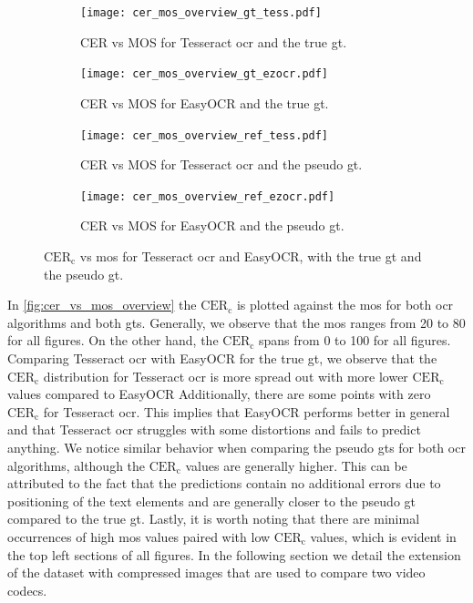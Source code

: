 \begin{figure}
    \begin{subfigure}[b]{0.45\textwidth}
        \centering
        \texttt{[image: cer\_mos\_overview\_gt\_tess.pdf]}
        \caption{CER vs MOS for Tesseract \gls{ocr} and the true \gls{gt}.}
        \label{fig:cer_vs_mos_gt_tess}
    \end{subfigure}
    \hfill
    \begin{subfigure}[b]{0.45\textwidth}
        \centering
        \texttt{[image: cer\_mos\_overview\_gt\_ezocr.pdf]}
        \caption{CER vs MOS for EasyOCR and the true \gls{gt}.}
        \label{fig:cer_vs_mos_gt_ocr}
    \end{subfigure}
    \newline
    \begin{subfigure}[b]{0.45\textwidth}
        \centering
        \texttt{[image: cer\_mos\_overview\_ref\_tess.pdf]}
        \caption{CER vs MOS for Tesseract \gls{ocr} and the pseudo \gls{gt}.}
        \label{fig:cer_vs_mos_ref_tess}
    \end{subfigure}
    \hfill
    \begin{subfigure}[b]{0.45\textwidth}
        \centering
        \texttt{[image: cer\_mos\_overview\_ref\_ezocr.pdf]}
        \caption{CER vs MOS for EasyOCR and the pseudo \gls{gt}.}
        \label{fig:cer_vs_mos_ref_ocr}
    \end{subfigure}
    \caption{$\text{CER}_{\text{c}}$ vs \gls{mos} for Tesseract \gls{ocr} and EasyOCR, with the true \gls{gt} and the pseudo \gls{gt}.}
    \label{fig:cer_vs_mos_overview}
\end{figure}

In \autoref{fig:cer_vs_mos_overview} the $\text{CER}_{\text{c}}$ is plotted against the \gls{mos} for both \gls{ocr} algorithms and both \glspl{gt}.
Generally, we observe that the \gls{mos} ranges from 20 to 80 for all figures.
On the other hand, the $\text{CER}_{\text{c}}$ spans from 0 to 100 for all figures.
Comparing Tesseract \gls{ocr} with EasyOCR for the true \gls{gt}, we observe that the $\text{CER}_{\text{c}}$ distribution for Tesseract \gls{ocr} is more spread out with more lower $\text{CER}_{\text{c}}$ values compared to EasyOCR
Additionally, there are some points with zero $\text{CER}_{\text{c}}$ for Tesseract \gls{ocr}.
This implies that EasyOCR performs better in general and that Tesseract \gls{ocr} struggles with some distortions and fails to predict anything.
We notice similar behavior when comparing the pseudo \glspl{gt} for both \gls{ocr} algorithms, although the $\text{CER}_{\text{c}}$ values are generally higher.
This can be attributed to the fact that the predictions contain no additional errors due to positioning of the text elements and are generally closer to the pseudo \gls{gt} compared to the true \gls{gt}.
Lastly, it is worth noting that there are minimal occurrences of high \gls{mos} values paired with low $\text{CER}_{\text{c}}$ values, which is evident in the top left sections of all figures.
In the following section we detail the extension of the dataset with compressed images that are used to compare two video codecs.


